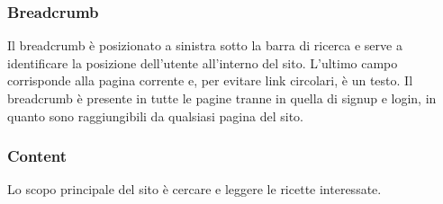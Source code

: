 \subsubsection{Breadcrumb}
\label{ssub:breadcrumb}
Il breadcrumb è posizionato a sinistra sotto la barra di ricerca e serve a identificare la posizione dell'utente all'interno del sito. L'ultimo campo corrisponde alla pagina corrente e, per evitare link circolari, è un testo.
Il breadcrumb è presente in tutte le pagine tranne in quella di signup e login, in quanto sono raggiungibili da qualsiasi pagina del sito.
\subsubsection{Content}
\label{ssub:content}
Lo scopo principale del sito è cercare e leggere le ricette interessate.

